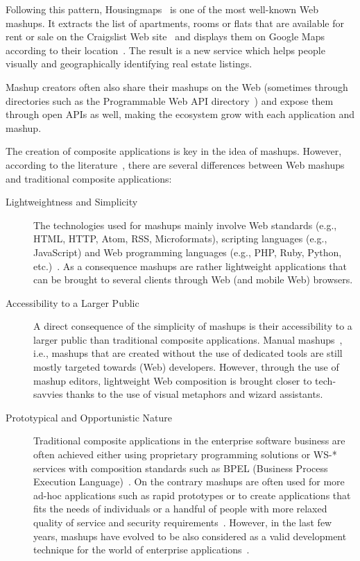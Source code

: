 Following this pattern, Housingmaps~ is one of the most well-known Web mashups. It extracts the list of apartments, rooms or flats that are available for rent or sale on the Craigslist Web site~ and displays them on Google Maps~ according to their location~\cite{Yee2008}. The result is a new service which helps people visually and geographically identifying real estate listings.

Mashup creators often also share their mashups on the Web (sometimes through directories such as the Programmable Web API directory~) and expose them through open APIs as well, making the ecosystem grow with each application and mashup.

The creation of composite applications is key in the idea of mashups. However, according to the literature~\cite{Yu2008a,Pautasso2008,Hartmann2008,Brandt2009}, there are several differences between Web mashups and traditional composite applications:
\begin{description}
  \item[Lightweightness and Simplicity] The technologies used for mashups mainly involve Web standards (e.g., HTML, HTTP, Atom, RSS, Microformats), scripting languages (e.g., JavaScript) and Web programming languages (e.g., PHP, Ruby, Python, etc.)~\cite{Yee2008,Yu2008a}. As a consequence mashups are rather lightweight applications that can be brought to several clients through Web (and mobile Web) browsers. 
 
  \item[Accessibility to a Larger Public] A direct consequence of the simplicity of mashups is their accessibility to a larger public than traditional composite applications. Manual mashups~\cite{Yu2008a}, i.e., mashups that are created without the use of dedicated tools are still mostly targeted towards (Web) developers. However, through the use of mashup editors, lightweight Web composition is brought closer to tech-savvies thanks to the use of visual metaphors and wizard assistants. 
 
  \item[Prototypical and Opportunistic Nature] Traditional composite applications in the enterprise software business are often achieved either using proprietary programming solutions or WS-* services with composition standards such as BPEL (Business Process Execution Language)~\cite{Hoyer2008,Pautasso2008}. On the contrary mashups are often used for more ad-hoc applications such as rapid prototypes or to create applications that fits the needs of individuals or a handful of people with more relaxed quality of service and security requirements~\cite{Pautasso2008,Brandt2009}. However, in the last few years, mashups have evolved to be also considered as a valid development technique for the world of enterprise applications~\cite{Hoyer2008}. 
\end{description}

